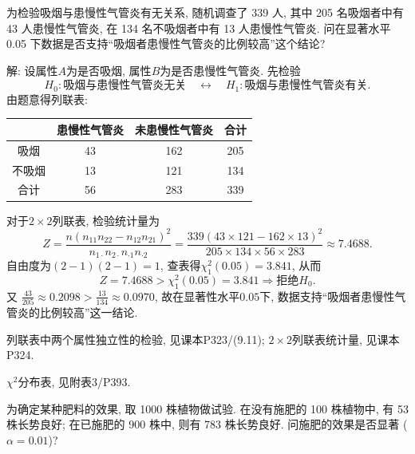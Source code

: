 \documentclass[standard]{ExBook}
\renewenvironment{shaded}{%
  \def\FrameCommand{\fboxsep=\FrameSep \colorbox{shadecolor}}%
  \MakeFramed{\advance\hsize-\width \FrameRestore}%
}{%
  \endMakeFramed
}
\begin{document}
\begin{qitems}
    \begin{bbox}
    \begin{shaded}
        \qitem 
为检验吸烟与患慢性气管炎有无关系, 随机调查了 339 人, 其中 205 名吸烟者中有 43 人患慢性气管炎, 在 134 名不吸烟者中有 13 人患慢性气管炎. 问在显著水平 0.05 下数据是否支持``吸烟者患慢性气管炎的比例较高''这个结论?
    \end{shaded}
    \end{bbox}

\vspace{\dimexpr2.5cm-5em\relax}

解: 设属性$A$为是否吸烟, 属性$B$为是否患慢性气管炎. 先检验
$$
H_0:\text{吸烟与患慢性气管炎无关}
\quad\leftrightarrow\quad
H_1:\text{吸烟与患慢性气管炎有关}.
$$
由题意得列联表:
\begin{center}
\setlength{\tabcolsep}{28pt}
\begin{tabular}{c|cc|c}
\hline
 & 患慢性气管炎 & 未患慢性气管炎 & 合计\\
\hline
吸烟 & 43 & 162 & 205\\
不吸烟 & 13 & 121 & 134\\
\hline
合计 & 56 & 283 & 339\\
\hline
\end{tabular}
\end{center}
对于$2\times2$列联表, 检验统计量为
$$
Z
=\frac{n(n_{11}n_{22}-n_{12}n_{21})^2}
{n_{1\cdot}n_{2\cdot}n_{\cdot1}n_{\cdot2}}
=\frac{339(43\times121-162\times13)^2}
{205\times134\times56\times283}
\approx7.4688.
$$
自由度为$(2-1)(2-1)=1$, 查表得$\chi_1^2(0.05)=3.841$, 从而
$$
Z=7.4688>\chi_1^2(0.05)=3.841
\Longrightarrow
\text{拒绝}H_0.
$$
又
$
\frac{43}{205}\approx0.2098>
\frac{13}{134}\approx0.0970
$, 
故在显著性水平$0.05$下, 数据支持“吸烟者患慢性气管炎的比例较高”这一结论.

\textcolor{themeColor}{\selectfont {} 列联表中两个属性独立性的检验, 见课本P323/(9.11); $2\times2$列联表统计量, 见课本P324.}

\textcolor{themeColor}{\selectfont {} $\chi^2$分布表, 见附表3/P393.}

\vspace{2.5cm-5em}

    \begin{bbox}
    \begin{shaded}
        \qitem
为确定某种肥料的效果, 取 1000 株植物做试验. 在没有施肥的 100 株植物中, 有 53 株长势良好; 在已施肥的 900 株中, 则有 783 株长势良好. 问施肥的效果是否显著 ($\alpha=0.01$)?
    \end{shaded}
    \end{bbox}


\end{qitems}
\end{document}
